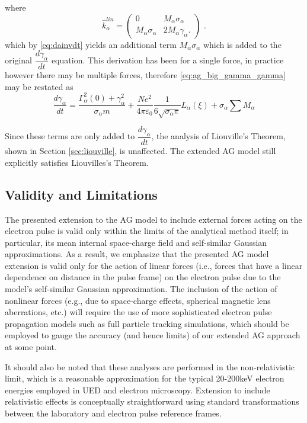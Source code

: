 where
\begin{equation}
\hat{k}^{lin}_{\alpha} =
\begin{pmatrix}
0 & M_{\alpha} \sigma_{\alpha} \\
M_{\alpha} \sigma_{\alpha} & 2 M_{\alpha} \gamma_{\alpha} \text{.}
\end{pmatrix} \text{ .}
\end{equation}
which by \ref{eq:dainvdt} yields an additional term $M_{\alpha} \sigma_{\alpha}$ which is added to the original $\dfrac{d \gamma_{\alpha}}{d t}$ equation.
This derivation has been for a single force, in practice however there may be multiple forces, therefore \ref{eq:ag_big_gamma_gamma} may be restated as
\begin{equation}
  \frac{d\gamma_{\alpha}}{dt} = \frac{ \Gamma_{\alpha}^2(0) + \gamma_{\alpha}^2 }{\sigma_{\alpha} m}
    + \frac{N e^2}{4\pi\varepsilon_0} \frac{1}{6 \sqrt{\sigma_{\alpha}\pi}} L_{\alpha}(\xi) + \sigma_{\alpha} \sum M_{\alpha} 
\end{equation}

Since these terms are only added to $\dfrac{d \gamma_{\alpha}}{d t}$, the analysis of Liouville's Theorem, shown in Section \ref{sec:liouville}, is unaffected.
The extended AG model still explicitly satisfies Liouvilles's Theorem.

\subsection{Validity and Limitations}

The presented extension to the AG model to include external forces acting on the electron pulse is valid only within the limits of the analytical method itself; in particular, its mean internal space-charge field and self-similar Gaussian approximations.\cite{michalik_analytic_2006}
As a result, we emphasize that the presented AG model extension is valid only for the action of linear forces (i.e., forces that have a linear dependence on distance in the pulse frame) on the electron pulse due to the model's self-similar Gaussian approximation.
The inclusion of the action of nonlinear forces (e.g., due to space-charge effects, spherical magnetic lens aberrations, etc.) will require the use of more sophisticated electron pulse propagation models such as full particle tracking simulations, which should be employed to gauge the accuracy (and hence limits) of our extended AG approach at some point.

It should also be noted that these analyses are performed in the non-relativistic limit, which is a reasonable approximation for the typical 20-200keV electron energies employed in UED and electron microscopy.
Extension to include relativistic effects is conceptually straightforward using standard transformations between the laboratory and electron pulse reference frames.


